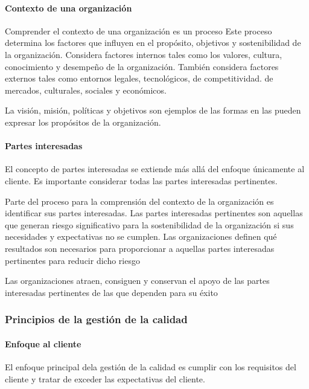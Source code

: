 				\paragraph{Contexto de una organización}
					Comprender el contexto de una organización es un proceso Este proceso determina los factores que
					influyen en el propósito, objetivos y sostenibilidad de la organización. Considera factores internos tales
					como los valores, cultura, conocimiento y desempeño de la organización. También considera factores
					externos tales como entornos legales, tecnológicos, de competitividad. de mercados, culturales, sociales
					y económicos.
					
					\newpage
					\thispagestyle{plain}
					
					\par	
						\noindent La visión, misión, políticas y objetivos son ejemplos de las formas en las pueden expresar los propósitos
						de la organización.
						
					\paragraph{Partes interesadas}
						El concepto de partes interesadas se extiende más allá del enfoque únicamente al cliente. Es importante
						considerar todas las partes interesadas pertinentes.
						
					\par 
						\noindent Parte del proceso para la comprensión del contexto de la organización es identificar sus partes
						interesadas. Las partes interesadas pertinentes son aquellas que generan riesgo significativo para la
						sostenibilidad de la organización si sus necesidades y expectativas no se cumplen. Las organizaciones
						definen qué resultados son necesarios para proporcionar a aquellas partes interesadas pertinentes para
						reducir dicho riesgo
						
					\par 
						\noindent Las organizaciones atraen, consiguen y conservan el apoyo de las partes interesadas pertinentes de las
						que dependen para su éxito
							
				\subsubsection{Principios de la gestión de la calidad}
					\paragraph{Enfoque al cliente}
						El enfoque principal dela gestión de la calidad es cumplir con los requisitos del cliente y tratar de exceder
						las expectativas del cliente.
